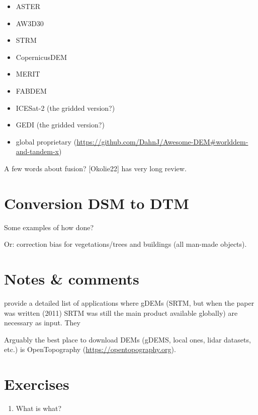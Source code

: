 
\begin{itemize}
  \item ASTER
  \item AW3D30
  \item STRM
  \item CopernicusDEM
  \item MERIT
  \item FABDEM
  \item ICESat-2 (the gridded version?)
  \item GEDI (the gridded version?)
  \item global proprietary (\url{https://github.com/DahnJ/Awesome-DEM#worlddem-and-tandem-x})
\end{itemize}

A few words about fusion? [Okolie22] has very long review.


%
\section{Conversion DSM to DTM}

Some examples of how done?

Or: correction bias for vegetations/trees and buildings (all man-made objects).

%
\section{Notes \& comments}

\citet{Yang11} provide a detailed list of applications where gDEMs (SRTM, but when the paper was written (2011) SRTM was still the main product available globally) are necessary as input.
They 

Arguably the best place to download DEMs (gDEMS, local ones, lidar datasets, etc.) is OpenTopography (\url{https://opentopography.org}).




%
\section{Exercises}

\begin{enumerate}
  \item What is what?
\end{enumerate}
